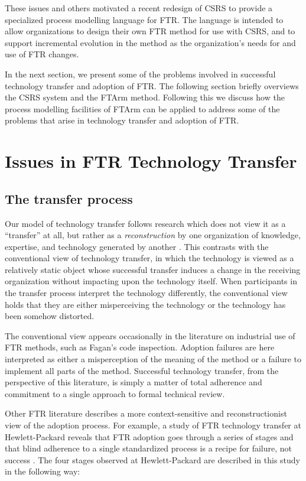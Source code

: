 These issues and others motivated a recent redesign of CSRS to provide a
specialized process modelling language for FTR.  The language is intended
to allow organizations to design their own FTR method for use with CSRS, and
to support incremental evolution in the method as the organization's
needs for and use of FTR changes.

In the next section, we present some of the problems involved in successful
technology transfer and adoption of FTR.  The following section briefly
overviews the CSRS system and the FTArm method.  Following this we discuss
how the process modelling facilities of FTArm can be applied to address
some of the problems that arise in technology transfer and adoption of FTR.

\section{Issues in FTR Technology Transfer}

\subsection{The transfer process}

Our model of technology transfer follows research which does not view it as
a ``transfer'' at all, but rather as a {\em reconstruction} by one
organization of knowledge, expertise, and technology generated by another
\cite{Doheny-Farina92}.  This contrasts with the conventional view of
technology transfer, in which the technology is viewed as a relatively
static object whose successful transfer induces a change in the receiving
organization without impacting upon the technology itself.  When
participants in the transfer process interpret the technology differently,
the conventional view holds that they are either misperceiving the
technology or the technology has been somehow distorted.

The conventional view appears occasionally in the literature on industrial
use of FTR methods, such as Fagan's code inspection. Adoption failures are
here interpreted as either a misperception of the meaning of the method or
a failure to implement all parts of the method.  Successful technology
transfer, from the perspective of this literature, is simply a matter of
total adherence and commitment to a single approach to formal technical
review.

Other FTR literature describes a more context-sensitive and
reconstructionist view of the adoption process.  For example, a study of
FTR technology transfer at Hewlett-Packard reveals that FTR adoption goes
through a series of stages and that blind adherence to a single
standardized process is a recipe for failure, not success \cite{Grady94}.
The four stages observed at Hewlett-Packard are described in this study in
the following way:

